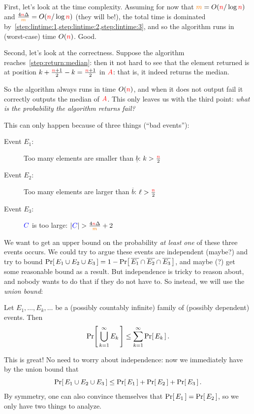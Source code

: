 First, let's look at the time complexity. Assuming for now that $\orange{m} = \bigO{\ns/\log\ns}$ and $\frac{4\ns\Delta}{\orange{m}} = \bigO{\ns/\log\ns}$ (they will be!), the total time is dominated by~\cref{step:lintime:1,step:lintime:2,step:lintime:3}, and so the algorithm runs in (worst-case) time $O({\textcolor{red}{n}})$. Good.

Second, let's look at the correctness. Suppose the algorithm reaches~\cref{step:return:median}: then it not hard to see that the element returned is at position $k+\frac{{\textcolor{red}{n}}+1}{2}-k = \frac{{\textcolor{red}{n}}+1}{2}$ in $\textcolor{red}{A}$: that is, it indeed returns the median. 

So the algorithm always runs in time $O({\textcolor{red}{n}})$, and when it does not output \textsf{fail} it correctly outputs the median of $\textcolor{red}{A}$. This only leaves us with the third point: \emph{what is the probability the algorithm returns \textsf{fail}?}

This can only happen because of three things (``bad events''):
\begin{description}
    \item[Event ${E}_1$:] Too many elements are smaller than $\underline{b}$: $k > \frac{{\textcolor{red}{n}}}{2}$
    \item[Event ${E}_2$:]  Too many elements are larger than $\overline{b}$: $\ell > \frac{{\textcolor{red}{n}}}{2}$
    \item[Event ${E}_3$:]  $\textcolor{blue}{C}$ is too large: $|\textcolor{blue}{C}| > \frac{4{\textcolor{red}{n}}\Delta}{\textcolor{orange}{m}}+2$
\end{description}
We want to get an upper bound on the probability \emph{at least one} of these three events occurs. We could try to argue these events are independent (maybe?) and try to bound $\probaOf{E_1\cup E_2\cup E_3} = 1-\probaOf{\overline{E_1}\cap\overline{E_2}\cap\overline{E_3}}$, and maybe (?) get some reasonable bound as a result. But independence is tricky to reason about, and nobody wants to do that if they do not have to. So instead, we will use the \emph{union bound}:
\begin{lemma}
Let $E_1,\dots,E_k,\dots$ be a (possibly countably infinite) family of (possibly dependent) events. Then
\[
    \probaOf{ \bigcup_{k=1}^\infty E_k } \leq \sum_{k=1}^\infty \probaOf{E_k}\,. 
\]
\end{lemma}
This is great! No need to worry about independence: now we immediately have by the union bound that
\begin{equation}
    \label{eq:first:union:bound}
    \probaOf{E_1\cup E_2\cup E_3} \leq \probaOf{E_1}+\probaOf{E_2}+\probaOf{E_3}\,.
\end{equation}
By symmetry, one can also convince themselves that $\probaOf{E_1}=\probaOf{E_2}$, so we only have two things to analyze.

